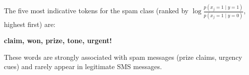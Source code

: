 \begin{answer}
The five most indicative tokens for the spam class (ranked by $\log\frac{p(x_j=1\mid y=1)}{p(x_j=1\mid y=0)}$, highest first) are:

\begin{center}
\textbf{claim, won, prize, tone, urgent!}
\end{center}

These words are strongly associated with spam messages (prize claims, urgency cues) and rarely appear in legitimate SMS messages.
\end{answer}
